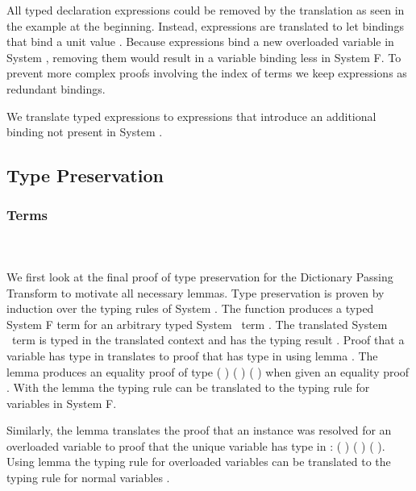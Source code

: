 \noindent All typed declaration expressions  could be removed by the translation as seen in the example at the beginning. 
Instead,  expressions are translated to let bindings that bind a unit value .
Because  expressions bind a new overloaded variable in System \Fo, removing them would result in a variable binding less in System F. To prevent more complex proofs involving the index  of terms we keep  expressions as redundant  bindings. 

\noindent We translate typed  expressions to  expressions that introduce an additional binding not present in System \Fo.

\subsection{Type Preservation}
\subsubsection{Terms}\hfill\\\\
We first look at the final proof of type preservation for the Dictionary Passing Transform to motivate all necessary lemmas. 
Type preservation is proven by induction over the typing rules of System \Fo. 
The function  produces a typed System F term for an arbitrary typed System \Fo\ term . 
The translated System \Fo\ term   is typed in the translated context   and has the typing result  .
\DPTTermPres
Proof  that a variable  has type  in  translates to proof that   has type   in   using lemma . 
The lemma produces an equality proof of type  ( ) ( )  ( ) when given an equality proof      .
With the lemma  the typing rule  can be translated to the typing rule for variables in System F. 

\noindent Similarly, the lemma  translates the proof that an instance  \Constr{:}  was resolved for an overloaded variable  to proof that the unique variable   has type   in  :  ( ) ( )  ( ).  
Using lemma  the typing rule for overloaded variables  can be translated to the typing rule for normal variables .

